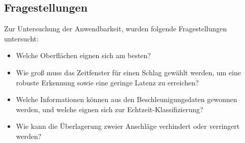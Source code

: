 \subsection*{Fragestellungen}
Zur Untersuchung der Anwendbarkeit, wurden folgende Fragestellungen untersucht:
\begin{itemize}
	\item Welche Oberflächen eignen sich am besten?
	\item Wie groß muss das Zeitfenster für einen Schlag gewählt werden, um eine robuste Erkennung sowie eine geringe Latenz zu erreichen?
	\item Welche Informationen können aus den Beschleunigungsdaten gewonnen werden, und welche eignen sich zur Echtzeit-Klassifizierung?
	\item Wie kann die Überlagerung zweier Anschläge verhindert oder verringert werden?
\end{itemize}